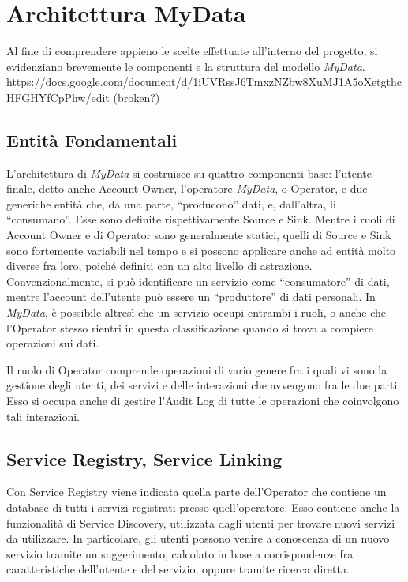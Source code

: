 \chapter{Architettura MyData}
\label{capitolo3}
\thispagestyle{empty}

\noindent Al fine di comprendere appieno le scelte effettuate all’interno del progetto, si evidenziano brevemente le componenti e la struttura del modello \textit{MyData}\cite{githubmydatastack}. 
https://docs.google.com/document/d/1iUVRssJ6TmxzNZbw8XuMJ1A5oXetgthcHFGHYfCpPhw/edit (broken?)

\section{Entit\`a Fondamentali}
L’architettura di \textit{MyData} si costruisce su quattro componenti base: l’utente finale, detto anche Account Owner, l’operatore \textit{MyData}, o Operator, e due generiche entit\`a che, da una parte, “producono” dati, e, dall’altra, li “consumano”. Esse sono definite rispettivamente Source e Sink. Mentre i ruoli di Account Owner e di Operator sono generalmente statici, quelli di Source e Sink sono fortemente variabili nel tempo e si possono applicare anche ad entit\`a molto diverse fra loro, poich\'e definiti con un alto livello di astrazione. Convenzionalmente, si pu\`o identificare un servizio come “consumatore” di dati, mentre l’account dell’utente pu\`o essere un “produttore” di dati personali. In \textit{MyData}, \`e possibile altres\`i che un servizio occupi entrambi i ruoli, o anche che l’Operator stesso rientri in questa classificazione quando si trova a compiere operazioni sui dati.

Il ruolo di Operator comprende operazioni di vario genere fra i quali vi sono la gestione degli utenti, dei servizi e delle interazioni che avvengono fra le due parti. Esso si occupa anche di gestire l’Audit Log di tutte le operazioni che coinvolgono tali interazioni.

\section{Service Registry, Service Linking}
Con Service Registry viene indicata quella parte dell’Operator che contiene un database di tutti i servizi registrati presso quell’operatore. Esso contiene anche la funzionalit\`a di Service Discovery, utilizzata dagli utenti per trovare nuovi servizi da utilizzare. In particolare, gli utenti possono venire a conoscenza di un nuovo servizio tramite un suggerimento, calcolato in base a corrispondenze fra caratteristiche dell’utente e del servizio, oppure tramite ricerca diretta.


